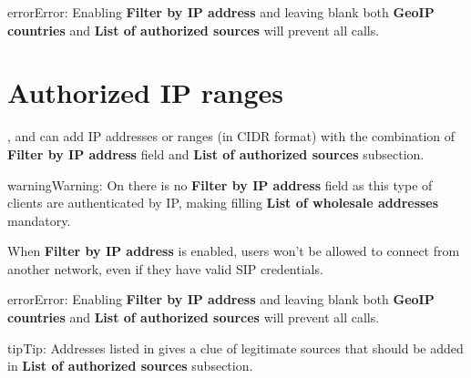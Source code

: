 \documentclass[letterpaper,10pt,english]{sphinxmanual}
\begin{document}
\begin{notice}{error}{Error:}
Enabling \textbf{Filter by IP address} and leaving blank both \textbf{GeoIP countries} and \textbf{List of authorized sources}
will prevent all calls.
\end{notice}


\section{Authorized IP ranges}
\label{security_and_maintenance/security/authorized_ip_ranges:client-authorized-ip-ranges}\label{security_and_maintenance/security/authorized_ip_ranges::doc}\label{security_and_maintenance/security/authorized_ip_ranges:authorized-ip-ranges}
{\hyperref[administration_portal/client/vpbx/index:vpbx\string-clients]{}}, {\hyperref[administration_portal/client/retail/index:retail\string-clients]{}} and {\hyperref[administration_portal/client/residential/index:residential\string-clients]{}} can add IP addresses or ranges
(in CIDR format) with the combination of \textbf{Filter by IP address} field and \textbf{List of authorized sources} subsection.

\begin{notice}{warning}{Warning:}
On {\hyperref[administration_portal/client/wholesale/index:wholesale\string-clients]{}} there is no \textbf{Filter by IP address} field as this type of clients are authenticated by IP, making
filling \textbf{List of wholesale addresses} mandatory.
\end{notice}

When \textbf{Filter by IP address} is enabled, users won't be allowed to connect from another network, even if they have
valid SIP credentials.

\begin{notice}{error}{Error:}
Enabling \textbf{Filter by IP address} and leaving blank both \textbf{GeoIP countries} and \textbf{List of authorized sources}
will prevent all calls.
\end{notice}

\begin{notice}{tip}{Tip:}
Addresses listed in {\hyperref[administration_portal/brand/views/ipfilter_blocked_addresses:ip\string-filter\string-blocked\string-addresses]{}} gives a clue of legitimate sources that should be
added in \textbf{List of authorized sources} subsection.
\end{notice}
\end{document}
